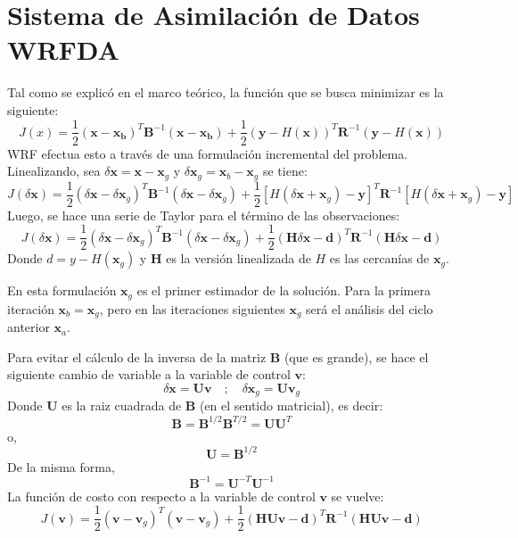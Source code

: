 \section{Sistema de Asimilación de Datos WRFDA}
Tal como se explicó en el marco teórico, la función que se busca minimizar es la siguiente:
\begin{equation}
J(x) = \frac{1}{2}(\mathbf{x}-\mathbf{x_b})^T\mathbf{B}^{-1}(\mathbf{x}-\mathbf{x_b}) + \frac{1}{2}(\mathbf{y}-H(\mathbf{x}))^T \mathbf{R}^{-1}(\mathbf{y}-H(\mathbf{x}))
\end{equation}
WRF efectua esto a través de una formulación incremental del problema. Linealizando, sea $\delta \mathbf{x}=\mathbf{x} - \mathbf{x}_g$ y $\delta \mathbf{x}_g=\mathbf{x}_b - \mathbf{x}_g$ se tiene:
\begin{equation}
	J(\delta \mathbf{x}) = \frac{1}{2}(\delta \mathbf{x}- \delta \mathbf{x}_g)^T\mathbf{B}^{-1}(\delta \mathbf{x} - \delta \mathbf{x}_g) + \frac{1}{2}[H(\delta \mathbf{x} + \mathbf{x}_g)-\mathbf{y}]^T \mathbf{R}^{-1}[H(\delta \mathbf{x} + \mathbf{x}_g)-\mathbf{y}]
\end{equation}
Luego, se hace una serie de Taylor para el término de las observaciones:
\begin{equation}
J(\delta \mathbf{x}) = \frac{1}{2}(\delta \mathbf{x}- \delta \mathbf{x}_g)^T\mathbf{B}^{-1}(\delta \mathbf{x} - \delta \mathbf{x}_g) + \frac{1}{2}(\mathbf{H} \delta \mathbf{x} -\textbf{d})^T \mathbf{R}^{-1}(\mathbf{H}\delta \mathbf{x} -\textbf{d})
\end{equation}
Donde $d=y-H(\textbf{x}_g )$ y $\textbf{H}$ es la versión linealizada de $H$ es las cercanías de $\textbf{x}_g$.

En esta formulación $\textbf{x}_g$ es el primer estimador de la solución. Para la primera iteración $\textbf{x}_b=\textbf{x}_g$, pero en las iteraciones siguientes $\textbf{x}_g$ será el análisis del ciclo anterior $\textbf{x}_a$.

Para evitar el cálculo de la inversa de la matriz $\textbf{B}$ (que es grande), se hace el siguiente cambio de variable a la variable de control $\textbf{v}$:
\begin{equation}
	\delta \mathbf{x}=\textbf{U}\textbf{v}\quad;\quad \delta \mathbf{x}_g=\textbf{U}\textbf{v}_g 
\end{equation}
Donde $\textbf{U}$ es la raiz cuadrada de $\textbf{B}$ (en el sentido matricial), es decir:
\begin{equation}
\textbf{B}=\textbf{B}^{1/2}\textbf{B}^{T/2} = \textbf{U}\textbf{U}^{T}
\end{equation}
o,
\begin{equation}
\textbf{U}=\textbf{B}^{1/2}
\end{equation}
De la misma forma,
\begin{equation}
\textbf{B}^{-1} = \textbf{U}^{-T}\textbf{U}^{-1}
\end{equation}
La función de costo con respecto a la variable de control $\textbf{v}$ se vuelve:
\begin{equation}
J(\mathbf{v}) = \frac{1}{2}(\mathbf{v}- \mathbf{v}_g)^T(\mathbf{v} - \mathbf{v}_g) + \frac{1}{2}(\mathbf{H} \mathbf{U}\mathbf{v} -\textbf{d})^T \mathbf{R}^{-1}(\mathbf{H}\mathbf{U}\mathbf{v} -\textbf{d})
\end{equation}

